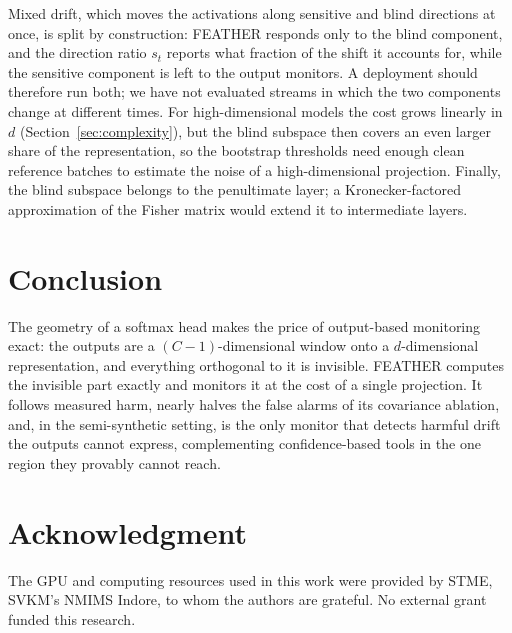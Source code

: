 \documentclass[conference]{IEEEtran}
\begin{document}
Mixed drift, which moves the activations along sensitive and blind
directions at once, is split by construction: FEATHER responds only to the
blind component, and the direction ratio $s_t$ reports what fraction of the
shift it accounts for, while the sensitive component is left to the output
monitors. A deployment should therefore run both; we have not evaluated
streams in which the two components change at different times. For
high-dimensional models the cost grows linearly in $d$
(Section~\ref{sec:complexity}), but the blind subspace then covers an even
larger share of the representation, so the bootstrap thresholds need enough
clean reference batches to estimate the noise of a high-dimensional
projection. Finally, the blind subspace belongs to the penultimate layer; a
Kronecker-factored approximation of the Fisher matrix would extend it to
intermediate layers.

\section{Conclusion}
\label{sec:conclusion}

The geometry of a softmax head makes the price of output-based monitoring
exact: the outputs are a $(C-1)$-dimensional window onto a $d$-dimensional
representation, and everything orthogonal to it is invisible. FEATHER computes
the invisible part exactly and monitors it at the cost of a single projection.
It follows measured harm, nearly halves the false alarms of its covariance
ablation, and, in the semi-synthetic setting, is the only monitor that detects
harmful drift the outputs cannot express, complementing confidence-based tools
in the one region they provably cannot reach.

\section*{Acknowledgment}
The GPU and computing resources used in this work were provided by STME,
SVKM's NMIMS Indore, to whom the authors are grateful. No external grant
funded this research.



\end{document}

